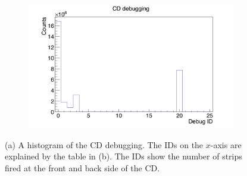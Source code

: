 \documentclass[twoside,english]{uiofysmaster/uiofysmaster}
\begin{document}
\begin{figure}[htb]
	\centering
	\begin{subfigure}[b]{0.49\textwidth}
		\centering
		\includegraphics[width=\textwidth]{../Plots/plotting/cd_debug-user.png}
		\caption{}
	\end{subfigure}
	\hfill
	\begin{subfigure}[b]{0.49\textwidth}
		\centering
    		 \newline %
    		\caption{}
	\end{subfigure}
	\caption{(a) A histogram of the CD debugging. The IDs on the $x$-axis are explained by the table in (b). The IDs show the number of strips fired at the front and back side of the CD.}
	\label{fig:CD_debug}
\end{figure}
\end{document}
